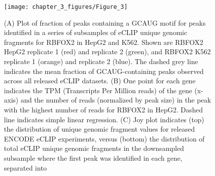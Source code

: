 \begin{figure}[ht]
  \centering
  \texttt{[image: chapter\_3\_figures/Figure\_3]}
  \caption[Figure 3. Dependency of peak discovery on sequencing depth]{(A) Plot of fraction of peaks containing a GCAUG motif for peaks identified in a series of subsamples of eCLIP unique genomic fragments for RBFOX2 in HepG2 and K562. Shown are RBFOX2 HepG2 replicate 1 (red) and replicate 2 (green), and RBFOX2 K562 replicate 1 (orange) and replicate 2 (blue). The dashed grey line indicates the mean fraction of GCAUG-containing peaks observed across all released eCLIP datasets. (B) One point for each gene indicates the TPM (Transcripts Per Million reads) of the gene (x-axis) and the number of reads (normalized by peak size) in the peak with the highest number of reads for RBFOX2 in HepG2. Dashed line indicates simple linear regression. (C) Joy plot indicates (top) the distribution of unique genomic fragment values for released ENCODE eCLIP experiments, versus (bottom) the distribution of total eCLIP unique genomic fragments in the downsampled subsample where the first peak was identified in each gene, separated into}
  \label{fig:Figure_3}
\end{figure}

